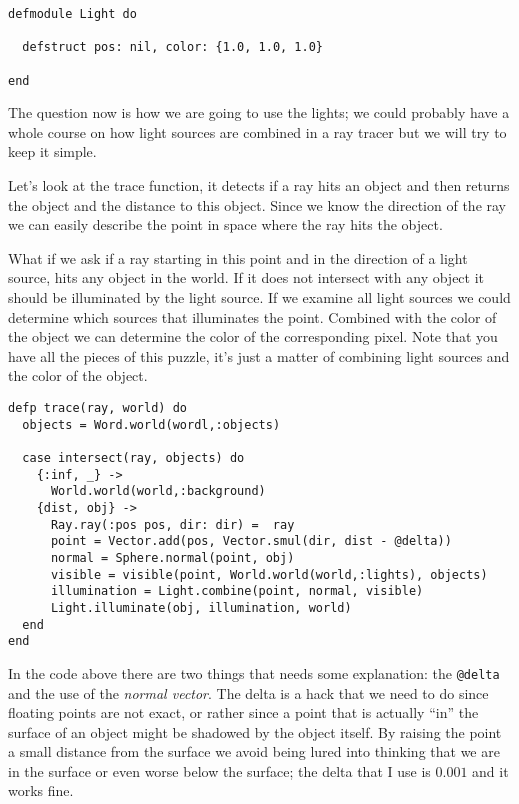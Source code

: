 \documentclass[a4paper,11pt]{article}
\begin{document}
\begin{verbatim}
defmodule Light do

  defstruct pos: nil, color: {1.0, 1.0, 1.0}

end
\end{verbatim}

The question now is how we are going to use the lights; we could
probably have a whole course on how light sources are combined in a
ray tracer but we will try to keep it simple. 

Let's look at the trace function, it detects if a ray hits an object
and then returns the object and the distance to this object. Since we
know the direction of the ray we can easily describe the point in
space where the ray hits the object.

What if we ask if a ray starting in this point and in the direction of
a light source, hits any object in the world. If it does not intersect
with any object it should be illuminated by the light source. If we
examine all light sources we could determine which sources that
illuminates the point. Combined with the color of the object we can
determine the color of the corresponding pixel. Note that you
have all the pieces of this puzzle, it's just a matter of combining
light sources and the color of the object.

\pagebreak

\begin{verbatim}
defp trace(ray, world) do
  objects = Word.world(wordl,:objects)

  case intersect(ray, objects) do
    {:inf, _} ->
      World.world(world,:background)
    {dist, obj} ->
      Ray.ray(:pos pos, dir: dir) =  ray
      point = Vector.add(pos, Vector.smul(dir, dist - @delta))
      normal = Sphere.normal(point, obj)
      visible = visible(point, World.world(world,:lights), objects)
      illumination = Light.combine(point, normal, visible)
      Light.illuminate(obj, illumination, world)
  end
end
\end{verbatim}

In the code above there are two things that needs some explanation:
the {\tt @delta} and the use of the {\em normal vector}. The delta is
a hack that we need to do since floating points are not exact, or
rather since a point that is actually ``in'' the surface of an object
might be shadowed by the object itself. By raising the point a small
distance from the surface we avoid being lured into thinking that we
are in the surface or even worse below the surface; the delta that I
use is $0.001$ and it works fine.
\end{document}
